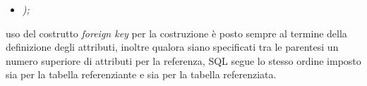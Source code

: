 \documentclass{article}
\begin{document}
\begin{itemize}[label={ }, leftmargin=1cm]
    \item \textit{);}
\end{itemize}
uso del costrutto \textit{foreign key} per la costruzione è posto sempre al termine della definizione degli attributi, inoltre qualora siano specificati tra le parentesi un numero superiore di attributi per la referenza, SQL segue lo stesso ordine imposto sia per la tabella referenziante e sia per la tabella referenziata.
\end{document}
